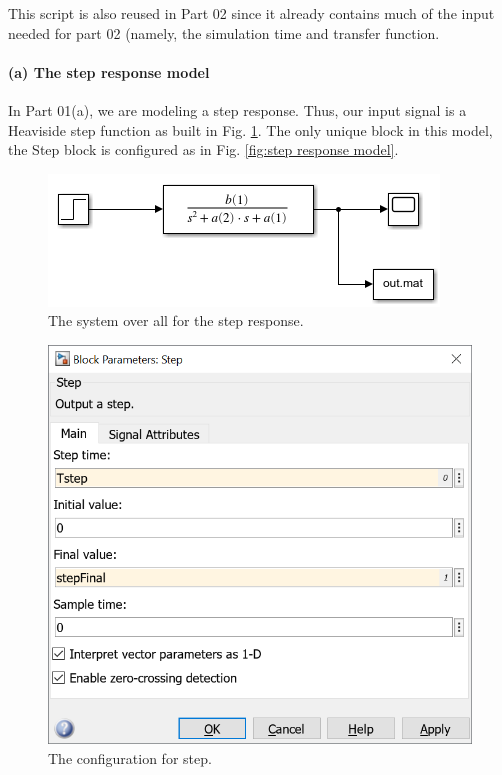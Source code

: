 \documentclass[12pt]{article}
\begin{document}
This script is also reused in Part 02 since it already contains much of the input needed for part 02 (namely, the simulation time and transfer function.

\paragraph{(a) The step response model}

In Part 01(a), we are modeling a step response. Thus, our input signal is a Heaviside step function as built in Fig. \ref{fig:step response model system}.
The only unique block in this model, the Step block is configured as in Fig. \ref{fig:step response model}.

\begin{figure}[h]
    \centering
    \includegraphics[width=\linewidth]{part01a_step_response_model.png}
    \caption{The system over all for the step response.}
    \label{fig:step response model system}
\end{figure}

\begin{figure}[h]
    \centering
    \includegraphics[width=(5in/689)*689]{part01a_step_parameters.png}
    \caption{The configuration for step.}
    \label{fig:step response model parameters}
\end{figure}
\end{document}
